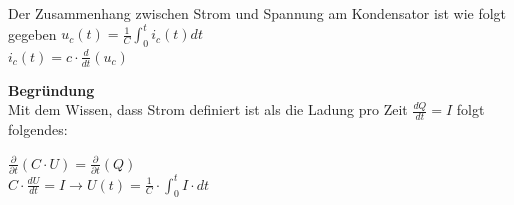 												\beginip
												Der Zusammenhang zwischen Strom und Spannung am Kondensator ist wie folgt gegeben
												\formulaBegin
												$\displaystyle u_c(t) = \frac{1}{C} \int_0^t i_c(t) dt$ \\

												$\displaystyle i_c(t) = c \cdot \frac{d}{d t} (u_c)$ \\
												\formulaEnd
												\iend


												\textbf{Begründung} \\
													Mit dem Wissen, dass Strom definiert ist als die Ladung pro Zeit $ \displaystyle \frac{dQ}{dt} = I$ folgt folgendes: \\
													\begin{center}
													$\displaystyle \frac{\partial}{\partial t} (C \cdot U) = \frac{\partial}{\partial t} (Q) $ \\
													$ \displaystyle C  \cdot \frac{dU}{dt} = I \rightarrow U(t) = \frac{1}{C} \cdot \int_0^t I \cdot dt$
												\end{center}
